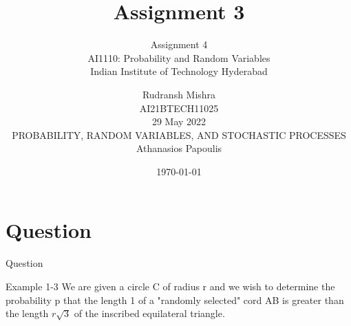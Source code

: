 \documentclass{beamer}
\title{Assignment 3\4}
\subtitle{Assignment 4 \\ \Large AI1110: Probability and Random Variables \\ \large Indian Institute of Technology Hyderabad}
\author{Rudransh Mishra \\ \normalsize AI21BTECH11025 \\ \vspace*{20pt} \normalsize  29 May 2022 \\ \vspace*{20pt} PROBABILITY, RANDOM VARIABLES, AND STOCHASTIC PROCESSES\\ \normalsize Athanasios Papoulis}
\date{\today}
\begin{document}
\begin{frame}
    \titlepage 
\end{frame}

\logo{}


\section{Question}
\begin{frame}{Question}
    \begin{block}{Example 1-3}
        We are given a circle C of radius r and we wish to determine the             probability p that the length 1 of a "randomly selected" cord AB is         greater than the length $r \sqrt 3 $ of the inscribed equilateral           triangle.
    \end{block}
\end{frame}
\end{document}
